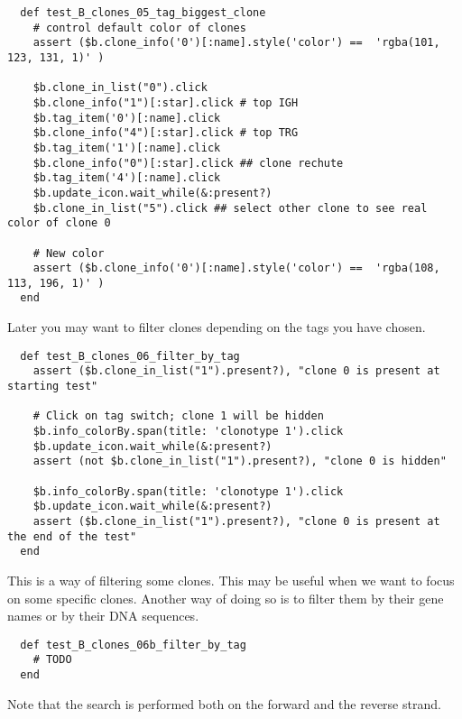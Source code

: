 \begin{verbatim}
  def test_B_clones_05_tag_biggest_clone
    # control default color of clones
    assert ($b.clone_info('0')[:name].style('color') ==  'rgba(101, 123, 131, 1)' )

    $b.clone_in_list("0").click
    $b.clone_info("1")[:star].click # top IGH
    $b.tag_item('0')[:name].click
    $b.clone_info("4")[:star].click # top TRG 
    $b.tag_item('1')[:name].click
    $b.clone_info("0")[:star].click ## clone rechute
    $b.tag_item('4')[:name].click
    $b.update_icon.wait_while(&:present?)
    $b.clone_in_list("5").click ## select other clone to see real color of clone 0

    # New color
    assert ($b.clone_info('0')[:name].style('color') ==  'rgba(108, 113, 196, 1)' )
  end
\end{verbatim}

Later you may want to filter clones depending on the tags you have chosen.


\begin{verbatim}
  def test_B_clones_06_filter_by_tag
    assert ($b.clone_in_list("1").present?), "clone 0 is present at starting test"

    # Click on tag switch; clone 1 will be hidden
    $b.info_colorBy.span(title: 'clonotype 1').click
    $b.update_icon.wait_while(&:present?)
    assert (not $b.clone_in_list("1").present?), "clone 0 is hidden"

    $b.info_colorBy.span(title: 'clonotype 1').click
    $b.update_icon.wait_while(&:present?)
    assert ($b.clone_in_list("1").present?), "clone 0 is present at the end of the test"
  end
\end{verbatim}

This is a way of filtering some clones. This may be useful when we want to
focus on some specific clones. Another way of doing so is to filter them by
their gene names or by their DNA sequences.  


\begin{verbatim}
  def test_B_clones_06b_filter_by_tag
    # TODO
  end
\end{verbatim}

Note that the search is performed both on the forward and the reverse strand.

